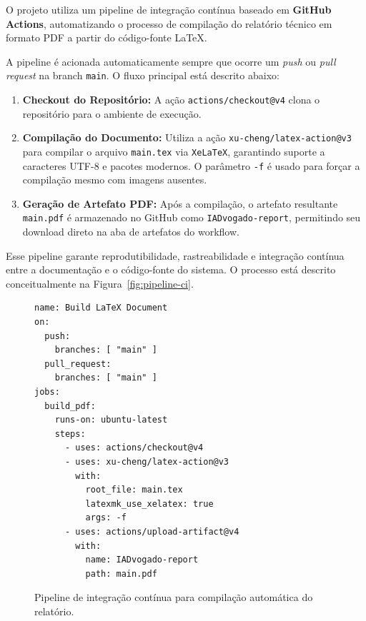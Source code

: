 \documentclass{article}
\begin{document}
O projeto utiliza um pipeline de integração contínua baseado em \textbf{GitHub Actions}, automatizando o processo de compilação do relatório técnico em formato PDF a partir do código-fonte \LaTeX.

A pipeline é acionada automaticamente sempre que ocorre um \textit{push} ou \textit{pull request} na branch \texttt{main}. O fluxo principal está descrito abaixo:

\begin{enumerate}
  \item \textbf{Checkout do Repositório:} A ação \texttt{actions/checkout@v4} clona o repositório para o ambiente de execução.
  \item \textbf{Compilação do Documento:} Utiliza a ação \texttt{xu-cheng/latex-action@v3} para compilar o arquivo \texttt{main.tex} via \texttt{XeLaTeX}, garantindo suporte a caracteres UTF-8 e pacotes modernos. O parâmetro \texttt{-f} é usado para forçar a compilação mesmo com imagens ausentes.
  \item \textbf{Geração de Artefato PDF:} Após a compilação, o artefato resultante \texttt{main.pdf} é armazenado no GitHub como \texttt{IADvogado-report}, permitindo seu download direto na aba de artefatos do workflow.
\end{enumerate}

Esse pipeline garante reprodutibilidade, rastreabilidade e integração contínua entre a documentação e o código-fonte do sistema. O processo está descrito conceitualmente na Figura~\ref{fig:pipeline-ci}.

\begin{figure}[H]
\centering
\begin{verbatim}
name: Build LaTeX Document
on:
  push:
    branches: [ "main" ]
  pull_request:
    branches: [ "main" ]
jobs:
  build_pdf:
    runs-on: ubuntu-latest
    steps:
      - uses: actions/checkout@v4
      - uses: xu-cheng/latex-action@v3
        with:
          root_file: main.tex
          latexmk_use_xelatex: true
          args: -f
      - uses: actions/upload-artifact@v4
        with:
          name: IADvogado-report
          path: main.pdf
\end{verbatim}
\caption{Pipeline de integração contínua para compilação automática do relatório.}
\end{figure}


\newpage
\end{document}
